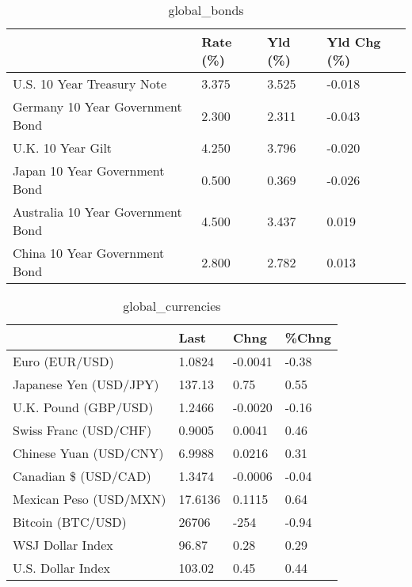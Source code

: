 \documentclass{article}%
\begin{document}
%


\begin{table}[htbp]%
\caption{global\_bonds}%
\centering%
\begin{adjustbox}{width=1\textwidth}%
\begin{tabular}{llll}
\toprule
                                  & Rate (\%) & Yld (\%) & Yld Chg (\%) \\
\midrule
       U.S. 10 Year Treasury Note &    3.375 &   3.525 &      -0.018 \\
  Germany 10 Year Government Bond &    2.300 &   2.311 &      -0.043 \\
                U.K. 10 Year Gilt &    4.250 &   3.796 &      -0.020 \\
    Japan 10 Year Government Bond &    0.500 &   0.369 &      -0.026 \\
Australia 10 Year Government Bond &    4.500 &   3.437 &       0.019 \\
    China 10 Year Government Bond &    2.800 &   2.782 &       0.013 \\
\bottomrule
\end{tabular}
%
\end{adjustbox}%
\end{table}

%


\begin{table}[htbp]%
\caption{global\_currencies}%
\centering%
\begin{adjustbox}{width=1\textwidth}%
\begin{tabular}{llll}
\toprule
                       &    Last &    Chng & \%Chng \\
\midrule
        Euro (EUR/USD) &  1.0824 & -0.0041 & -0.38 \\
Japanese Yen (USD/JPY) &  137.13 &    0.75 &  0.55 \\
  U.K. Pound (GBP/USD) &  1.2466 & -0.0020 & -0.16 \\
 Swiss Franc (USD/CHF) &  0.9005 &  0.0041 &  0.46 \\
Chinese Yuan (USD/CNY) &  6.9988 &  0.0216 &  0.31 \\
  Canadian \$ (USD/CAD) &  1.3474 & -0.0006 & -0.04 \\
Mexican Peso (USD/MXN) & 17.6136 &  0.1115 &  0.64 \\
     Bitcoin (BTC/USD) &   26706 &    -254 & -0.94 \\
      WSJ Dollar Index &   96.87 &    0.28 &  0.29 \\
     U.S. Dollar Index &  103.02 &    0.45 &  0.44 \\
\bottomrule
\end{tabular}
%
\end{adjustbox}%
\end{table}
\end{document}
